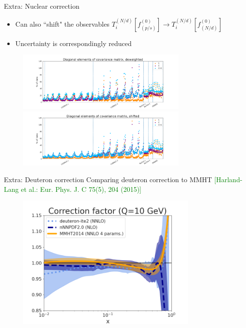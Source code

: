 \begin{frame}{Extra: Nuclear correction}
\begin{itemize}
\item Can also ``shift" the observables $T_i^{(N/d)}[f_(p/s)^{(0)}] \to T_i^{(N/d)}[f_{(N/d)}^{(0)}]$
\item Uncertainty is correspondingly reduced
\end{itemize}
  \begin{figure}
    \includegraphics[width=85mm]{nuclear_uncs/diagnuc_title.png}
    \includegraphics[width=85mm]{nuclear_uncs/diagnucshift.png}
  \end{figure}
\end{frame}
\begin{frame}{Extra: Deuteron correction}
Comparing deuteron correction to MMHT \tiny{ \textcolor{green}{[Harland-Lang et al.: Eur. Phys. J. C 75(5), 204 (2015)]}}
  \begin{figure}
    \includegraphics[width=90mm]{nuclear_uncs/corrfactor.png}
  \end{figure}
\end{frame}
